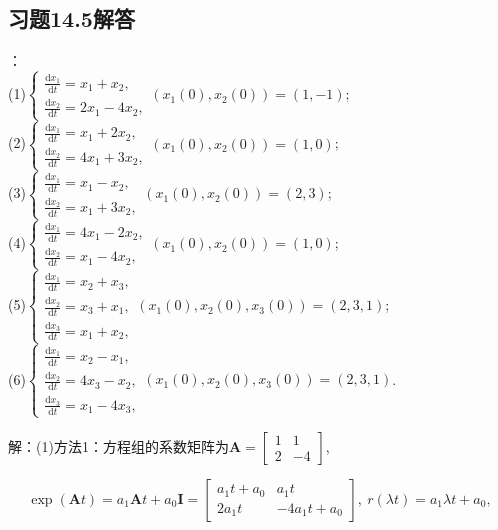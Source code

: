 \documentclass[12pt,UTF8]{ctexart}
\newcommand{\dd}[2]{\frac{\mathrm d #1}{\mathrm d #2}}
\begin{document}
\subsection{习题14.5解答}
\begin{enumerate}
：\\
(1)$\begin{cases}
\dd{x_1}t=x_1+x_2,\\
\dd{x_2}t=2x_1-4x_2,
\end{cases}(x_1(0),x_2(0))=(1,-1)$;\\
(2)$\begin{cases}
\dd{x_1}t=x_1+2x_2,\\
\dd{x_2}t=4x_1+3x_2,
\end{cases}(x_1(0),x_2(0))=(1,0)$;\\
(3)$\begin{cases}
\dd{x_1}t=x_1-x_2,\\
\dd{x_2}t=x_1+3x_2,
\end{cases}(x_1(0),x_2(0))=(2,3)$;\\
(4)$\begin{cases}
\dd{x_1}t=4x_1-2x_2,\\
\dd{x_2}t=x_1-4x_2,
\end{cases}(x_1(0),x_2(0))=(1,0)$;\\
(5)$\begin{cases}
\dd{x_1}t=x_2+x_3,\\
\dd{x_2}t=x_3+x_1,\\
\dd{x_3}t=x_1+x_2,
\end{cases}(x_1(0),x_2(0),x_3(0))=(2,3,1)$;\\
(6)$\begin{cases}
\dd{x_1}t=x_2-x_1,\\
\dd{x_2}t=4x_3-x_2,\\
\dd{x_3}t=x_1-4x_3,
\end{cases}(x_1(0),x_2(0),x_3(0))=(2,3,1)$.

解：(1)方法1：方程组的系数矩阵为$\bm A=\begin{bmatrix}1&1\\2&-4\end{bmatrix}$,

\[\exp(\bm At)=a_1\bm At+a_0\bm I=\begin{bmatrix}a_1t+a_0&a_1t\\2a_1t&-4a_1t+a_0\end{bmatrix},\ r(\lambda t)=a_1\lambda t+a_0,\]


\end{enumerate}
\end{document}
